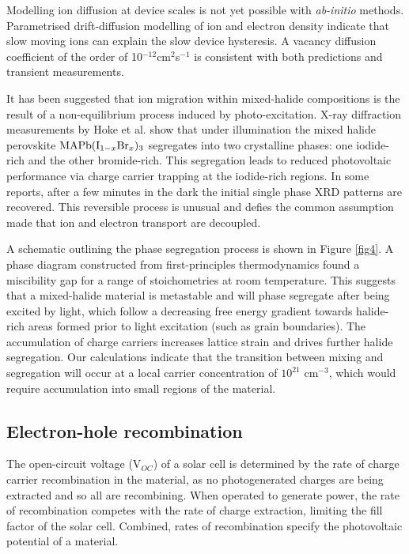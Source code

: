 Modelling ion diffusion at device scales is not yet possible with \emph{ab-initio} methods.
Parametrised drift-diffusion modelling of ion and electron density indicate that slow moving ions can explain the slow device hysteresis.\autocite{VanReenen2015,Richardson2016} 
A vacancy diffusion coefficient of the order of 10$^{-12}$cm$^2$s$^{-1}$ is consistent with both predictions and transient measurements.\autocite{Eames2015a}

It has been suggested that ion migration within mixed-halide compositions is the result of a non-equilibrium process induced by photo-excitation.
X-ray diffraction measurements by Hoke et al.\autocite{Hoke2015} show that under illumination the mixed halide perovskite $\ce{MAPb(I_{1-x}Br_x)3}$ segregates into two crystalline phases: one iodide-rich and the other bromide-rich.
This segregation leads to reduced photovoltaic performance via charge carrier trapping at the iodide-rich regions.
In some reports, after a few minutes in the dark the initial single phase XRD patterns are recovered. 
This reversible process is unusual and defies the common assumption made that ion and electron transport are decoupled.

A schematic outlining the phase segregation process is shown in Figure \ref{fig4}.
A phase diagram constructed from first-principles thermodynamics found a miscibility gap for a range of stoichometries at room temperature.\autocite{Brivio2016}
This suggests that a mixed-halide material is metastable and will phase segregate after being excited by light, which follow a decreasing free energy gradient towards halide-rich areas formed prior to light excitation (such as grain boundaries).
The accumulation of charge carriers increases lattice strain and drives further halide segregation.  
Our calculations indicate that the transition between mixing and segregation will occur at a local carrier concentration of $10^{21}$ cm$^{-3}$, which would require accumulation into small regions of the material. 

\subsection{Electron-hole recombination} \label{EHR}

The open-circuit voltage (V$_{OC}$) of a solar cell is determined by the rate of charge carrier recombination in the material, as no photogenerated charges are being extracted and so all are recombining. 
When operated to generate power, the rate of recombination competes with the rate of charge extraction, limiting the fill factor of the solar cell. 
Combined, rates of recombination specify the photovoltaic potential of a material. 

